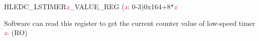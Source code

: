 \begin{register}{H}{LEDC\_LSTIMER\textcolor{red}{\it{x}}\_VALUE\_REG (\textcolor{red}{\it{x}}: 0-3)}{0x164+8*\textcolor{red}{\it{x}}}\label{regdesc:LEDCLSTIMERnVALUEREG}
%
%
\regnewline%
\begin{regdesc}\begin{reglist}
\item [LEDC\_LSTIMER\textcolor{red}{\it{x}}\_CNT]Software can read this register to get the current counter value of low-speed timer \textcolor{red}{\it{x}}. (RO)
\end{reglist}\end{regdesc}
\end{register}


